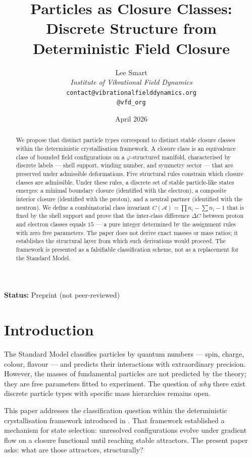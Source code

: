 \documentclass[12pt]{article}
\title{Particles as Closure Classes:\\Discrete Structure from Deterministic Field Closure}
\author{%
  Lee Smart\\[4pt]
  \textit{Institute of Vibrational Field Dynamics}\\[2pt]
  \texttt{contact@vibrationalfielddynamics.org}\\[2pt]
  \texttt{@vfd\_org}%
}
\date{April 2026}
\newcommand{\Acal}{\mathcal{A}}
\newcommand{\phig}{\varphi}
\begin{document}
\maketitle

\noindent\textbf{Status:} Preprint (not peer-reviewed)

\begin{abstract}
We propose that distinct particle types correspond to distinct stable closure classes within the deterministic crystallisation framework. A closure class is an equivalence class of bounded field configurations on a $\phig$-structured manifold, characterised by discrete labels --- shell support, winding number, and symmetry sector --- that are preserved under admissible deformations. Five structural rules constrain which closure classes are admissible. Under these rules, a discrete set of stable particle-like states emerges: a minimal boundary closure (identified with the electron), a composite interior closure (identified with the proton), and a neutral partner (identified with the neutron). We define a combinatorial class invariant $C(\Acal) = \prod n_i - \sum n_i - 1$ that is fixed by the shell support and prove that the inter-class difference $\Delta C$ between proton and electron classes equals $15$ --- a pure integer determined by the assignment rules with zero free parameters. The paper does not derive exact masses or mass ratios; it establishes the structural layer from which such derivations would proceed. The framework is presented as a falsifiable classification scheme, not as a replacement for the Standard Model.
\end{abstract}

\section{Introduction}\label{sec:intro}

The Standard Model classifies particles by quantum numbers --- spin, charge, colour, flavour --- and predicts their interactions with extraordinary precision. However, the masses of fundamental particles are not predicted by the theory; they are free parameters fitted to experiment. The question of \textit{why} there exist discrete particle types with specific mass hierarchies remains open.

This paper addresses the classification question within the deterministic crystallisation framework introduced in \citet{Smart2026}. That framework established a mechanism for state selection: unresolved configurations evolve under gradient flow on a closure functional until reaching stable attractors. The present paper asks: what are those attractors, structurally?
\end{document}
